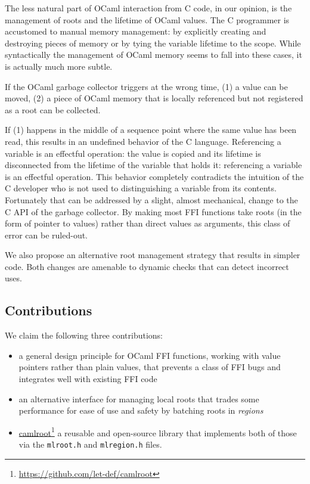 \documentclass[a4paper]{easychair}
\newcommand{\cpp}[1]{\lstinline[style=C++]{#1}}
\newcommand\fnurl[2]{%
\href{#2}{#1}\footnote{\url{#2}}%
}
\begin{document}
The less natural part of OCaml interaction from C code, in our opinion,
is the management of roots and the lifetime of OCaml values. The C
programmer is accustomed to manual memory management: by explicitly
creating and destroying pieces of memory or by tying the variable
lifetime to the scope. While syntactically the management of OCaml
memory seems to fall into these cases, it is actually much more subtle.

If the OCaml garbage collector triggers at the wrong time, (1) a value
can be moved, (2) a piece of OCaml memory that is locally referenced
but not registered as a root can be collected.

If (1) happens in the middle of a sequence point %
where the same value has been read, this results in an undefined behavior of
the C language. Referencing a variable is an effectful operation: the value
is copied and its lifetime is disconnected from the lifetime of the variable
that holds it: referencing a variable is an effectful operation.  This behavior
completely contradicts the intuition of the C developer who is not used to
distinguishing a variable from its contents.  Fortunately that can be addressed
by a slight, almost mechanical, change to the C API of the garbage collector.
By making most FFI functions take roots (in the form of pointer to values)
rather than direct values as arguments, this class of error can be ruled-out.

We also propose an alternative root management strategy that results in simpler
code.  Both changes are amenable to dynamic checks that can detect incorrect
uses.

\subsection{Contributions}

We claim the following three contributions:
%
\begin{itemize}
\item a general design principle for OCaml FFI functions, working with value
      pointers rather than plain values, that prevents a class of FFI bugs and
      integrates well with existing FFI code
\item an alternative interface for managing local roots that trades some
      performance for ease of use and safety by batching roots in
      {\em regions}
\item \fnurl{camlroot}{https://github.com/let-def/camlroot} a reusable and
      open-source library that implements both of those via the \cpp{mlroot.h}
      and \cpp{mlregion.h} files.
\end{itemize}
\end{document}
